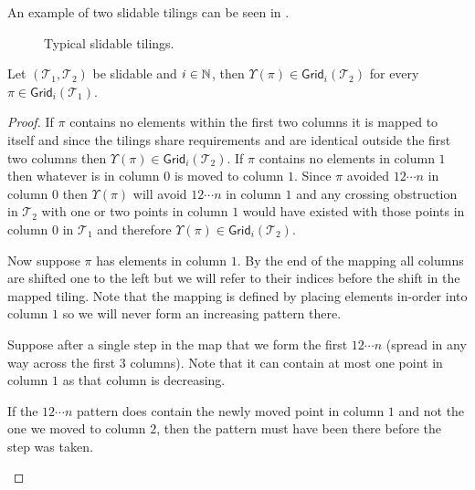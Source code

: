\begin{definition}
\begin{itemize}
\end{itemize}
\end{definition}

An example of two slidable tilings can be seen in .

\begin{figure}[ht]
    \centering
    
    \caption{Typical slidable tilings.}
    \label{fig:slidable_tilings}
\end{figure}

\begin{lemma}\label{lem:slidemap}
Let $(\mathcal{T}_1,\mathcal{T}_2)$ be slidable and $i \in \mathbb{N}$, then $\Upsilon(\pi) \in \textsf{Grid}_i(\mathcal{T}_2)$ for every $\pi \in \textsf{Grid}_i(\mathcal{T}_1)$.
\end{lemma}
\begin{proof}
If $\pi$ contains no elements within the first two columns it is mapped to itself and since the tilings share requirements and are identical outside the first two columns then $\Upsilon(\pi) \in \textsf{Grid}_i(\mathcal{T}_2)$. If $\pi$ contains no elements in column $1$ then whatever is in column $0$ is moved to column $1$. Since $\pi$ avoided $12\dotsm n$ in column $0$ then $\Upsilon(\pi)$ will avoid $12\dotsm n$ in column $1$ and any crossing obstruction in $\mathcal{T}_2$ with one or two points in column $1$ would have existed with those points in column $0$ in $\mathcal{T}_1$ and therefore $\Upsilon(\pi) \in \textsf{Grid}_i(\mathcal{T}_2)$.

Now suppose $\pi$ has elements in column $1$. By the end of the mapping all columns are shifted one to the left but we will refer to their indices before the shift in the mapped tiling. Note that the mapping is defined by placing elements in-order into column $1$ so we will never form an increasing pattern there. 

Suppose after a single step in the map that we form the first $12\cdots n$ (spread in any way across the first $3$ columns). Note that it can contain at most one point in column $1$ as that column is decreasing.

If the $12\cdots n$ pattern does contain the newly moved point in column $1$ and not the one we moved to column $2$, then the pattern must have been there before the step was taken.

\begin{center}

\end{center}


\end{proof}
